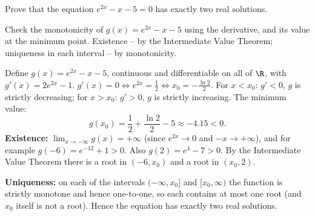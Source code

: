 
\begin{question}
Prove that the equation $e^{2x}-x-5=0$ has exactly two real solutions.
\end{question}

\begin{hint}
Check the monotonicity of $g(x)=e^{2x}-x-5$ using the derivative, and its value at the minimum point. Existence -- by the Intermediate Value Theorem; uniqueness in each interval -- by monotonicity.
\end{hint}

\begin{solution}
Define $g(x)=e^{2x}-x-5$, continuous and differentiable on all of $\R$, with $g'(x)=2e^{2x}-1$. $g'(x)=0\iff e^{2x}=\frac12\iff x_0=-\frac{\ln2}{2}$. For $x<x_0$: $g'<0$, $g$ is strictly decreasing; for $x>x_0$: $g'>0$, $g$ is strictly increasing. The minimum value:
\[ g(x_0)=\frac12+\frac{\ln2}{2}-5\approx-4.15<0. \]
\textbf{Existence:} $\lim_{x\to-\infty}g(x)=+\infty$ (since $e^{2x}\to0$ and $-x\to+\infty$), and for example $g(-6)=e^{-12}+1>0$. Also $g(2)=e^4-7>0$. By the Intermediate Value Theorem there is a root in $(-6,x_0)$ and a root in $(x_0,2)$.

\textbf{Uniqueness:} on each of the intervals $(-\infty,x_0]$ and $[x_0,\infty)$ the function is strictly monotone and hence one-to-one, so each contains at most one root (and $x_0$ itself is not a root). Hence the equation has exactly two real solutions.
\end{solution}
